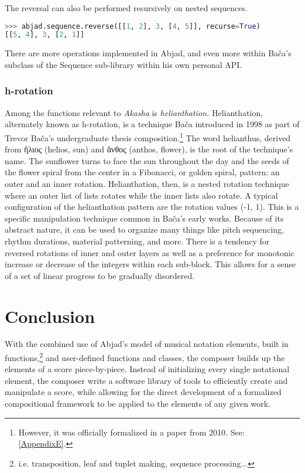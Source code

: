 The reversal can also be performed resursively on nested sequences.

\begin{lstlisting}[language=Python,frame=tb,caption={A recursively reversed sequence},label=lst:reverse-recurse]
>>> abjad.sequence.reverse([[1, 2], 3, [4, 5]], recurse=True)
[[5, 4], 3, [2, 1]]
\end{lstlisting}

There are more operations implemented in Abjad, and even more within Bača's subclass of the Sequence sub-library within his own personal \ac{API}.

\subsubsection{h-rotation}
\label{helianthus}
Among the functions relevant to \textit{Akasha} is \textit{helianthation.} Helianthation, alternately known as h-rotation, is a technique Bača introduced in 1998 as part of Trevor Ba\v{c}a's undergraduate thesis composition.\footnote{However, it was officially formalized in a paper from 2010. See: \vref{AppendixE}.} The word helianthus, derived from ἥλιος (helios, sun) and ἄνθος (anthos, flower), is the root of the technique's name. The sunflower turns to face the sun throughout the day and the seeds of the flower spiral from the center in a Fibonacci, or golden spiral, pattern: an outer and an inner rotation. Helianthation, then, is a nested rotation technique where an outer list of lists rotates while the inner lists also rotate. A typical configuration of the helianthation pattern are the rotation values (-1, 1). This is a specific manipulation technique common in Bača's early works. Because of its abstract nature, it can be used to organize many things like pitch sequencing, rhythm durations, material patterning, and more. There is a tendency for reversed rotations of inner and outer layers as well as a preference for monotonic increase or decrease of the integers within each sub-block. This allows for a sense of a set of linear progress to be gradually disordered.

\section{Conclusion}

With the combined use of Abjad's model of musical notation elements, built in functions,\footnote{i.e. transposition, leaf and tuplet making, sequence processing...} and user-defined functions and classes, the composer builds up the elements of a score piece-by-piece. Instead of initializing every single notational element, the composer write a software library of tools to efficiently create and manipulate a score, while allowing for the direct development of a formalized compositional framework to be applied to the elements of any given work.